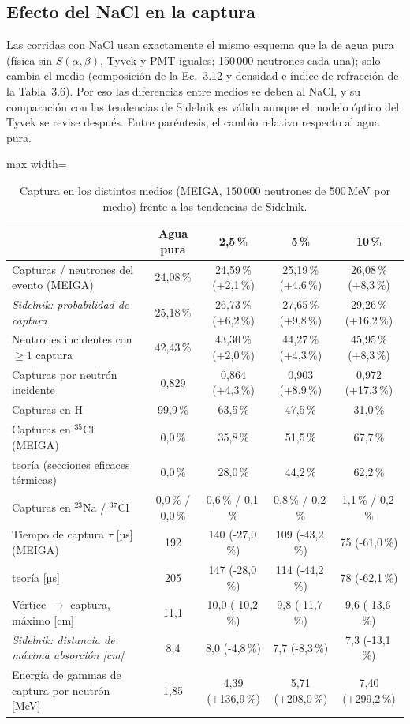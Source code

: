 \documentclass[11pt,a4paper]{article}
\begin{document}
\subsection{Efecto del NaCl en la captura}\label{sec:nacl25}
Las corridas con NaCl usan exactamente el mismo esquema que la de agua pura (física sin $S(\alpha,\beta)$, Tyvek y PMT iguales; 150\,000 neutrones cada una); solo cambia el medio
(composición de la Ec.~3.12 y densidad e índice de refracción de la Tabla~3.6). Por eso las diferencias entre medios se deben al NaCl, y su comparación con las tendencias de Sidelnik
es válida aunque el modelo óptico del Tyvek se revise después. Entre paréntesis, el cambio relativo respecto al agua pura.
\begin{table}[H]\centering\small\begin{adjustbox}{max width=\linewidth}\begin{tabular}{lcccc}\toprule
 & Agua pura & 2,5\,\% & 5\,\% & 10\,\% \\\midrule
Capturas / neutrones del evento (MEIGA) & 24,08\,\% & 24,59\,\% (+2,1\,\%) & 25,19\,\% (+4,6\,\%) & 26,08\,\% (+8,3\,\%) \\
\textit{Sidelnik: probabilidad de captura} & 25,18\,\% & 26,73\,\% (+6,2\,\%) & 27,65\,\% (+9,8\,\%) & 29,26\,\% (+16,2\,\%) \\
Neutrones incidentes con $\geq 1$ captura & 42,43\,\% & 43,30\,\% (+2,0\,\%) & 44,27\,\% (+4,3\,\%) & 45,95\,\% (+8,3\,\%) \\
Capturas por neutrón incidente & 0,829 & 0,864 (+4,3\,\%) & 0,903 (+8,9\,\%) & 0,972 (+17,3\,\%) \\
Capturas en H & 99,9\,\% & 63,5\,\% & 47,5\,\% & 31,0\,\% \\
Capturas en $^{35}$Cl (MEIGA) & 0,0\,\% & 35,8\,\% & 51,5\,\% & 67,7\,\% \\
\quad teoría (secciones eficaces térmicas) & 0,0\,\% & 28,0\,\% & 44,2\,\% & 62,2\,\% \\
Capturas en $^{23}$Na / $^{37}$Cl & 0,0\,\% / 0,0\,\% & 0,6\,\% / 0,1\,\% & 0,8\,\% / 0,2\,\% & 1,1\,\% / 0,2\,\% \\
Tiempo de captura $\tau$ [µs] (MEIGA) & 192 & 140 (-27,0\,\%) & 109 (-43,2\,\%) & 75 (-61,0\,\%) \\
\quad teoría [µs] & 205 & 147 (-28,0\,\%) & 114 (-44,2\,\%) & 78 (-62,1\,\%) \\
Vértice $\to$ captura, máximo [cm] & 11,1 & 10,0 (-10,2\,\%) & 9,8 (-11,7\,\%) & 9,6 (-13,6\,\%) \\
\textit{Sidelnik: distancia de máxima absorción [cm]} & 8,4 & 8,0 (-4,8\,\%) & 7,7 (-8,3\,\%) & 7,3 (-13,1\,\%) \\
Energía de gammas de captura por neutrón [MeV] & 1,85 & 4,39 (+136,9\,\%) & 5,71 (+208,0\,\%) & 7,40 (+299,2\,\%) \\
\bottomrule\end{tabular}\end{adjustbox}\caption{Captura en los distintos medios (MEIGA, 150\,000 neutrones de 500\,MeV por medio) frente a las tendencias de Sidelnik.}\label{tab:nacl}\end{table}
\end{document}
